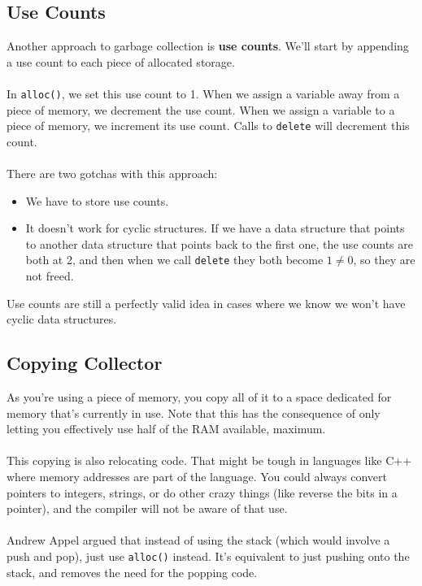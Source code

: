 \documentclass[]{article}
\theoremstyle{definition}
\begin{document}
		\subsection{Use Counts}
			Another approach to garbage collection is \textbf{use counts}. We'll start by appending a use count to each piece of allocated storage.
			\\ \\
			In \verb+alloc()+, we set this use count to 1. When we assign a variable away from a piece of memory, we decrement the use count. When we assign a variable to a piece of memory, we increment its use count. Calls to \verb+delete+ will decrement this count.
			\\ \\
			There are two gotchas with this approach:
			\begin{itemize}
				\item We have to store use counts.
				\item It doesn't work for cyclic structures. If we have a data structure that points to another data structure that points back to the first one, the use counts are both at 2, and then when we call \verb+delete+ they both become $1 \ne 0$, so they are not freed.
			\end{itemize}

			Use counts are still a perfectly valid idea in cases where we know we won't have cyclic data structures.

		\subsection{Copying Collector}
			As you're using a piece of memory, you copy all of it to a space dedicated for memory that's currently in use. Note that this has the consequence of only letting you effectively use half of the RAM available, maximum.
			\\ \\
			This copying is also relocating code. That might be tough in languages like C++ where memory addresses are part of the language. You could always convert pointers to integers, strings, or do other crazy things (like reverse the bits in a pointer), and the compiler will not be aware of that use.
			\\ \\
			Andrew Appel argued that instead of using the stack (which would involve a push and pop), just use \verb+alloc()+ instead. It's equivalent to just pushing onto the stack, and removes the need for the popping code.
\end{document}
